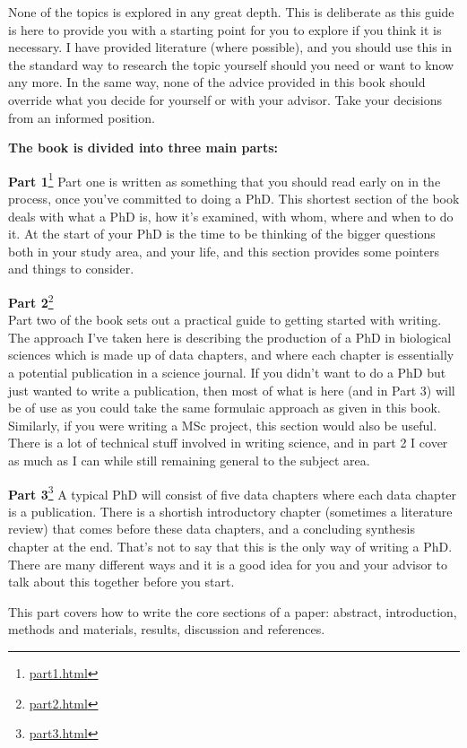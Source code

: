 \documentclass[
]{krantz}
\renewcommand{\href}[2]{#2\footnote{\url{#1}}}
\begin{document}
None of the topics is explored in any great depth. This is deliberate as this guide is here to provide you with a starting point for you to explore if you think it is necessary. I have provided literature (where possible), and you should use this in the standard way to research the topic yourself should you need or want to know any more. In the same way, none of the advice provided in this book should override what you decide for yourself or with your advisor. Take your decisions from an informed position.

\textbf{The book is divided into three main parts:}

\href{part1.html}{\textbf{Part 1}}
Part one is written as something that you should read early on in the process, once you've committed to doing a PhD. This shortest section of the book deals with what a PhD is, how it's examined, with whom, where and when to do it. At the start of your PhD is the time to be thinking of the bigger questions both in your study area, and your life, and this section provides some pointers and things to consider.

\href{part2.html}{\textbf{Part 2}}\\
Part two of the book sets out a practical guide to getting started with writing. The approach I've taken here is describing the production of a PhD in biological sciences which is made up of data chapters, and where each chapter is essentially a potential publication in a science journal. If you didn't want to do a PhD but just wanted to write a publication, then most of what is here (and in Part 3) will be of use as you could take the same formulaic approach as given in this book. Similarly, if you were writing a MSc project, this section would also be useful. There is a lot of technical stuff involved in writing science, and in part 2 I cover as much as I can while still remaining general to the subject area.

\href{part3.html}{\textbf{Part 3}}
A typical PhD will consist of five data chapters where each data chapter is a publication. There is a shortish introductory chapter (sometimes a literature review) that comes before these data chapters, and a concluding synthesis chapter at the end. That's not to say that this is the only way of writing a PhD. There are many different ways and it is a good idea for you and your advisor to talk about this together before you start.

This part covers how to write the core sections of a paper: abstract, introduction, methods and materials, results, discussion and references.
\end{document}
